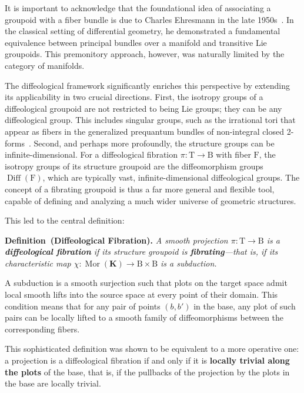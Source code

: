 \documentclass[10pt,reqno,letterpaper,twoside]{amsart}
\theoremstyle{article}
\newenvironment{definition}[1]%
{\noindent\textbf{Definition#1.} \it}%
{}
\newcommand{\KK}{\mathbf{K}}
\def \B{\mathrm B}
\def \F{\mathrm F}
\def \T{\mathrm T}
\DeclareMathOperator{\Diff}{Diff}
\newcommand{\Mor}{\operatorname{Mor}}
\begin{document}
  It is important to acknowledge that the foundational idea of associating a groupoid with a fiber bundle is due to Charles Ehresmann in the late 1950s~\cite{Ehr59}.
  In the classical setting of differential geometry,
  he demonstrated a fundamental equivalence between principal bundles over a manifold and transitive Lie groupoids.
  This premonitory approach,
  however,
  was naturally limited by the category of manifolds.
  
  The diffeological framework significantly enriches this perspective by extending its applicability in two crucial directions.
  First,
  the isotropy groups of a diffeological groupoid are not restricted to being Lie groups;
  they can be any diffeological group.
  This includes singular groups,
  such as the irrational tori that appear as fibers in the generalized prequantum bundles of non-integral closed 2-forms~\cite{PIZ95}.
  Second,
  and perhaps more profoundly,
  the structure groups can be infinite-dimensional.
  For a diffeological fibration $\pi : \T \to \B$ with fiber $\F$,
  the isotropy groups of its structure groupoid are the diffeomorphism groups $\Diff(\F)$,
  which are typically vast,
  infinite-dimensional diffeological groups.
  The concept of a fibrating groupoid is thus a far more general and flexible tool,
  capable of defining and analyzing a much wider universe of geometric structures.
  
  This led to the central definition:
  
  \begin{definition}{~(Diffeological Fibration)} A smooth projection $\pi : \T \to \B$ is a \textbf{diffeological fibration} if its structure groupoid is \textbf{fibrating}—that is,
    if its characteristic map $\chi: \Mor(\KK) \to \B \times \B$ is a \emph{subduction}.
  \end{definition}
  
  A subduction is a smooth surjection such that plots on the target space admit local smooth lifts into the source space at every point of their domain.
  This condition means that for any pair of points $(b, b')$ in the base, any plot of such pairs can be locally lifted to a smooth family of diffeomorphisms between the corresponding fibers.
  
  This sophisticated definition was shown to be equivalent to a more operative one:
  a projection is a diffeological fibration if and only if it is \textbf{locally trivial along the plots} of the base,
  that is,
  if the pullbacks of the projection by the plots in the base are locally trivial.
  
\end{document}
